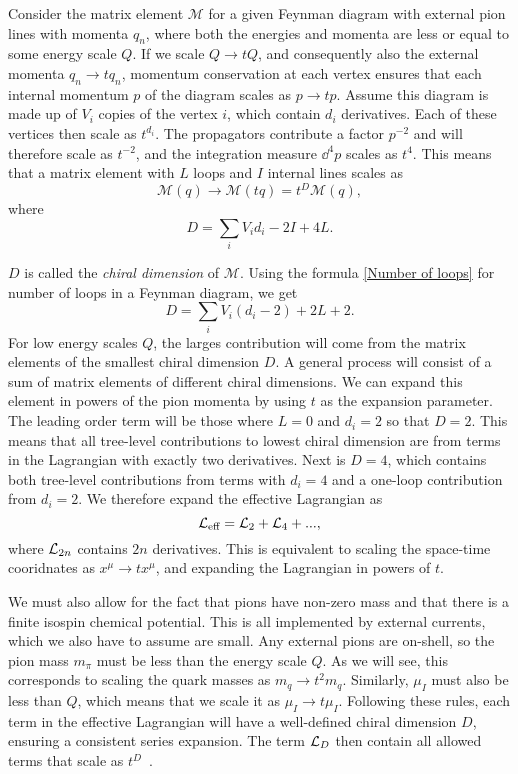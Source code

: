 Consider the matrix element $\mathcal M$ for a given Feynman diagram with external pion lines with momenta $q_n$, where both the energies and momenta are less or equal to some energy scale $Q$.
If we scale $Q\rightarrow tQ$, and consequently also the external momenta $q_n \rightarrow tq_n$, momentum conservation at each vertex ensures that each internal momentum $p$ of the diagram scales as $p \rightarrow tp$.
Assume this diagram is made up of $V_i$ copies of the vertex $i$, which contain $d_i$ derivatives.
Each of these vertices then scale as $t^{d_i}$.
The propagators contribute a factor $p^{-2}$ and will therefore scale as $t^{-2}$, and the integration measure $\dd^4 p$ scales as $t^4$.
This means that a matrix element with $L$ loops and $I$ internal lines scales as
\begin{equation}
    \mathcal M(q) \rightarrow \mathcal M(t q) = t^D \mathcal M(q),
\end{equation}
where 
\begin{equation}
    D = \sum_i V_i d_i - 2 I + 4 L.
\end{equation}

$D$ is called the \emph{chiral dimension} of $\mathcal M$.
Using the formula \cref{Number of loops} for number of loops in a Feynman diagram, we get
\begin{equation}
    D = \sum_i V_i(d_i - 2) + 2 L + 2.
\end{equation}
For low energy scales $Q$, the larges contribution will come from the matrix elements of the smallest chiral dimension $D$.
A general process will consist of a sum of matrix elements of different chiral dimensions.
We can expand this element in powers of the pion momenta by using $t$ as the expansion parameter.
The leading order term will be those where $L = 0$ and $d_i = 2$ so that $D = 2$.
This means that all tree-level contributions to lowest chiral dimension are from terms in the Lagrangian with exactly two derivatives.
Next is $D = 4$, which contains both tree-level contributions from terms with $d_i = 4$ and a one-loop contribution from $d_i = 2$.
We therefore expand the effective Lagrangian as
\begin{equation}
    \mathcal{L}_\text{eff} = \mathcal{L}_2 + \mathcal{L}_4 + ...,
\end{equation}
where $\mathcal{L}_{2n}$ contains $2n$ derivatives.
This is equivalent to scaling the space-time cooridnates as $x^\mu \rightarrow tx^\mu$, and expanding the Lagrangian in powers of $t$.

We must also allow for the fact that pions have non-zero mass and that there is a finite isospin chemical potential.
This is all implemented by external currents, which we also have to assume are small.
Any external pions are on-shell, so the pion mass $m_\pi$ must be less than the energy scale $Q$.
As we will see, this corresponds to scaling the quark masses as $m_q \rightarrow t^2 m_q$.
Similarly, $\mu_I$ must also be less than $Q$, which means that we scale it as $\mu_I\rightarrow t \mu_I$.
Following these rules, each term in the effective Lagrangian will have a well-defined chiral dimension $D$, ensuring a consistent series expansion.
The term $\mathcal{L}_{D}$ then contain all allowed terms that scale as $t^D$~\cite{weinberg_1996_vol2,WeinbergPhenom,Scherer2002IntroductionTC}.

